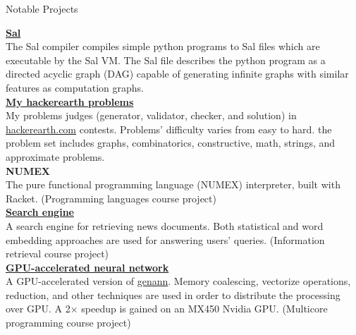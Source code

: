 \documentclass{resume} %
\begin{document}
\begin{rSection}{Notable Projects}

 
    {\bf \href{https://github.com/amsen20/Sal}{Sal}}
    \\
	The Sal compiler compiles simple python programs to Sal files which are executable by the Sal VM. The Sal file describes the python program as a directed acyclic graph (DAG) capable of generating infinite graphs with similar features as computation graphs.
    \vspace{2mm}\\
    {\bf \href{https://github.com/amsen20/hackerearth-problems}{My hackerearth problems}} 
    \\
    My problems judges (generator, validator, checker, and solution) in \href{https://www.hackerearth.com/}{hackerearth.com} contests. Problems' difficulty varies from easy to hard. the problem set includes graphs, combinatorics, constructive, math, strings, and approximate problems.
    \vspace{2mm}\\
    {\bf NUMEX}
    \\
    The pure functional programming language (NUMEX) interpreter, built with Racket. (Programming languages course project)
    \vspace{2mm}\\
    {\bf \href{https://github.com/amsen20/search-engine}{Search engine}}
    \\
    A search engine for retrieving news documents. Both statistical and word embedding approaches are used for answering users' queries. (Information retrieval course project)
    \vspace{2mm}\\
    {\bf \href{https://github.com/amsen20/MCP/tree/main/project/phase-two-GPU}{GPU-accelerated neural network}} %
    \\
    A GPU-accelerated version of \href{https://www.google.com/search?q=genann&oq=genann&aqs=chrome.0.69i59j69i57j69i59j69i60l5.721j0j4&sourceid=chrome&ie=UTF-8}{genann}. Memory coalescing, vectorize operations, reduction, and other techniques are used in order to distribute the processing over GPU. A 2$\times$ speedup is gained on an MX450 Nvidia GPU. (Multicore programming course project)
\end{rSection}
\end{document}
